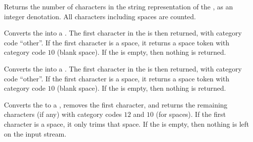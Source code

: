 \documentclass[oneside]{book}
\begin{document}
\begin{function}{\StVarCount}
\begin{syntax}
 
\end{syntax}
Returns the number of characters in the string representation of the ,
as an integer denotation. All characters including spaces are counted.
\begin{demohigh}
\strSet {}
\strVarCount \lTmpaStr
\end{demohigh}
\end{function}

\begin{function}{\strHead}
\begin{syntax}
 
\end{syntax}
Converts the  into a .
The first character in the  is then returned,
with category code \enquote{other}. If the first character is a space,
it returns a space token with category code $10$ (blank space).
If the  is empty, then nothing is returned.
\begin{demohigh}
\end{demohigh}
\end{function}

\begin{function}{\strVarHead}
\begin{syntax}
 
\end{syntax}
Converts the  into a .
The first character in the  is then returned,
with category code \enquote{other}. If the first character is a space,
it returns a space token with category code $10$ (blank space).
If the  is empty, then nothing is returned.
\begin{demohigh}
\strSet {}
\strVarHead \lTmpaStr
\end{demohigh}
\end{function}

\begin{function}{\strTail}
\begin{syntax}
 
\end{syntax}
Converts the  to a , removes the first
character, and returns the remaining characters (if any)
with category codes $12$ and $10$ (for spaces).
If the first character is a space, it only trims that space.
If the  is empty,
then nothing is left on the input stream.
\begin{demohigh}
\end{demohigh}
\end{function}
\end{document}
